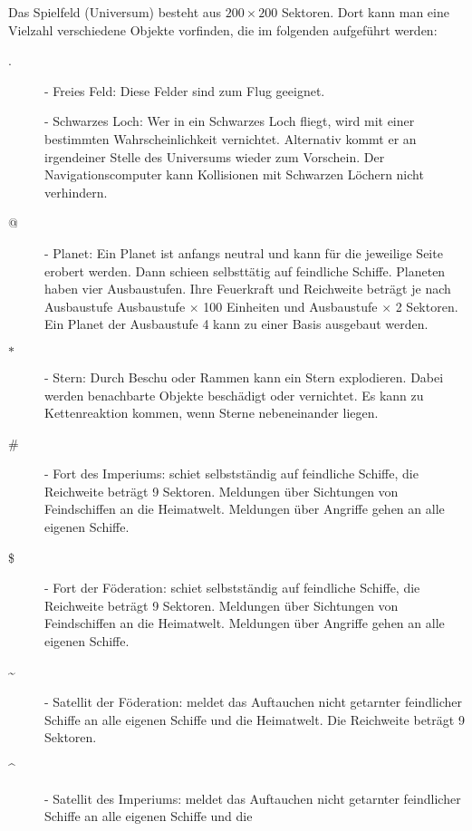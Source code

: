 Das Spielfeld (Universum) besteht aus 
$200\times200$ Sektoren. Dort kann man eine Vielzahl verschiedene
Objekte vorfinden, die im folgenden aufgef\"uhrt werden:

\begin{description}
\item [.] - Freies Feld: Diese Felder sind zum Flug geeignet.
\item [ ] - Schwarzes Loch: Wer in ein Schwarzes Loch fliegt, wird mit einer
            bestimmten Wahrscheinlichkeit vernichtet. Alternativ kommt
            er an irgendeiner Stelle des Universums wieder zum Vorschein. 
            Der Navigationscomputer kann Kollisionen mit Schwarzen 
            L\"ochern nicht verhindern.
\item[@] - Planet: Ein Planet ist anfangs neutral und kann f\"ur die jeweilige
                 Seite erobert werden. Dann schie\3en selbstt\"atig auf
                 feindliche Schiffe. Planeten haben vier Ausbaustufen. 
                 Ihre Feuerkraft und Reichweite betr\"agt je nach Ausbaustufe
                 Ausbaustufe $\times$ 100 Einheiten und 
                 Ausbaustufe $\times$ 2 Sektoren.
                 Ein Planet der Ausbaustufe 4 kann zu einer Basis 
                 ausgebaut werden.
\item [$\ast$] - Stern: Durch Beschu\3 oder Rammen kann ein Stern explodieren.
                 Dabei werden benachbarte Objekte besch\"adigt oder vernichtet.
                 Es kann zu Kettenreaktion kommen, wenn Sterne nebeneinander
                 liegen.
\item[\#] - Fort des Imperiums: schie\3t selbstst\"andig auf feindliche Schiffe, 
            die Reichweite betr\"agt 9 Sektoren.
            Meldungen \"uber Sichtungen von Feindschiffen an die Heimatwelt.
            Meldungen \"uber Angriffe gehen an alle eigenen Schiffe.
\item[\$] - Fort der F\"oderation: schie\3t selbstst\"andig 
            auf feindliche Schiffe, die Reichweite betr\"agt 9 Sektoren.
            Meldungen \"uber Sichtungen von Feindschiffen an die Heimatwelt.
            Meldungen \"uber Angriffe gehen an alle eigenen Schiffe.
\item[\~] - Satellit der F\"oderation: meldet das Auftauchen nicht 
            getarnter feindlicher Schiffe an alle eigenen Schiffe und die
            Heimatwelt. Die 
            Reichweite betr\"agt 9 Sektoren.
\item[\^] - Satellit des Imperiums: meldet das Auftauchen nicht 
            getarnter feindlicher Schiffe an alle eigenen Schiffe und die

\end{description}
